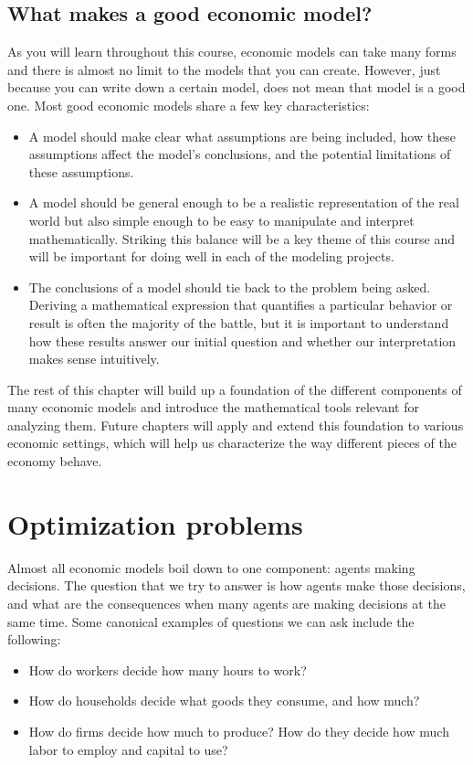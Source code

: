 \subsection*{What makes a good economic model?}
As you will learn throughout this course, economic models can take many forms and there is almost no limit to the models that you can create. However, just because you can write down a certain model, does not mean that model is a good one. Most good economic models share a few key characteristics:
\begin{itemize}
    \item A model should make clear what assumptions are being included, how these assumptions affect the model's conclusions, and the potential limitations of these assumptions.
    \item A model should be general enough to be a realistic representation of the real world but also simple enough to be easy to manipulate and interpret mathematically. Striking this balance will be a key theme of this course and will be important for doing well in each of the modeling projects.
    \item The conclusions of a model should tie back to the problem being asked. Deriving a mathematical expression that quantifies a particular behavior or result is often the majority of the battle, but it is important to understand how these results answer our initial question and whether our interpretation makes sense intuitively.
\end{itemize}
The rest of this chapter will build up a foundation of the different components of many economic models and introduce the mathematical tools relevant for analyzing them. Future chapters will apply and extend this foundation to various economic settings, which will help us characterize the way different pieces of the economy behave.

\section{Optimization problems}
Almost all economic models boil down to one component: agents making decisions. The question that we try to answer is how agents make those decisions, and what are the consequences when many agents are making decisions at the same time. Some canonical examples of questions we can ask include the following:
\begin{itemize}
    \item How do workers decide how many hours to work?
    \item How do households decide what goods they consume, and how much?
    \item How do firms decide how much to produce? How do they decide how much labor to employ and capital to use?
\end{itemize}

